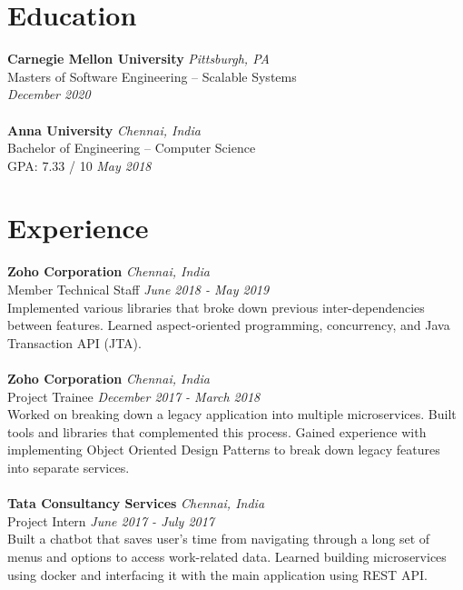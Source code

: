 \documentclass{resume}
\author{https://aravindvasu.dev}{Aravind Vasudevan}
\begin{document}
\begin{multicols*}{2}
[
\maketitle
]
\section*{Education}
\noindent
\textbf{Carnegie Mellon University} \hfill \textit{Pittsburgh, PA} \\
{\small Masters of Software Engineering -- Scalable Systems}  \\
\null\hfill \textit{\small December 2020} \\
\\
\textbf{Anna University} \hfill \textit{Chennai, India} \\
{\small Bachelor of Engineering -- Computer Science}  \\
{\small GPA: 7.33 / 10} \hfill \textit{\small May 2018}

\section*{Experience}
\noindent
\textbf{Zoho Corporation} \hfill \textit{Chennai, India} \\
{\small Member Technical Staff} \hfill \textit{\small June 2018 - May 2019}  \\
Implemented various libraries that broke down previous inter-dependencies between features. Learned aspect-oriented programming, concurrency, and Java Transaction API (JTA). \\
\\
\textbf{Zoho Corporation} \hfill \textit{Chennai, India} \\
{\small Project Trainee} \hfill \textit{\small December 2017 - March 2018}  \\
Worked on breaking down a legacy application into multiple microservices. Built tools and libraries that complemented this process. Gained experience with implementing Object Oriented Design Patterns to break down legacy features into separate services. \\
\\
\textbf{Tata Consultancy Services} \hfill \textit{Chennai, India} \\
{\small Project Intern} \hfill \textit{\small June 2017 - July 2017}  \\
Built a chatbot that saves user’s time from navigating through a long set of menus and options to access work-related data. Learned building microservices using docker and interfacing it with the main application using REST API. \\


\end{multicols*}
\end{document}
